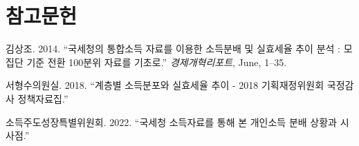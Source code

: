 \documentclass[
  a4paper,
  oneside,
  open=any]{scrbook}
\newlength{\cslhangindent}
\newenvironment{CSLReferences}[2] %
 {\begin{list}{}{%
  \setlength{\itemindent}{0pt}
  \setlength{\leftmargin}{0pt}
  \setlength{\parsep}{0pt}
  \ifodd #1
   \setlength{\leftmargin}{\cslhangindent}
   \setlength{\itemindent}{-1\cslhangindent}
  \fi
  \setlength{\itemsep}{#2\baselineskip}}}
 {\end{list}}
\begin{document}
\section*{참고문헌}\label{uxcc38uxace0uxbb38uxd5cc}

\label{refs}
\begin{CSLReferences}{1}{0}
김상조. 2014. {``{국세청의 통합소득 자료를 이용한 소득분배 및 실효세율
추이 분석 : 모집단 기준 전환 100분위 자료를 기초로}.''}
\emph{경제개혁리포트}, June, 1--35.

서형수의원실. 2018. {``계층별 소득분포와 실효세율 추이 - 2018
기획재정위원회 국정감사 정책자료집.''}

소득주도성장특별위원회. 2022. {``국세청 소득자료를 통해 본 개인소득 분배
상황과 시사점.''}

\end{CSLReferences}


\backmatter
\end{document}
